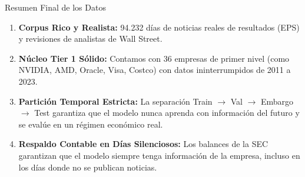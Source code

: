 \documentclass[aspectratio=169,11pt]{beamer}
\begin{document}
\begin{frame}{Resumen Final de los Datos}
    \begin{enumerate}
        \item \textbf{Corpus Rico y Realista:} 94.232 días de noticias reales de resultados (EPS) y revisiones de analistas de Wall Street.
        \vspace{0.2cm}
        \item \textbf{Núcleo Tier 1 Sólido:} Contamos con 36 empresas de primer nivel (como NVIDIA, AMD, Oracle, Visa, Costco) con datos ininterrumpidos de 2011 a 2023.
        \vspace{0.2cm}
        \item \textbf{Partición Temporal Estricta:} La separación Train $\to$ Val $\to$ Embargo $\to$ Test garantiza que el modelo nunca aprenda con información del futuro y se evalúe en un régimen económico real.
        \vspace{0.2cm}
        \item \textbf{Respaldo Contable en Días Silenciosos:} Los balances de la SEC garantizan que el modelo siempre tenga información de la empresa, incluso en los días donde no se publican noticias.
    \end{enumerate}
\end{frame}
\end{document}
